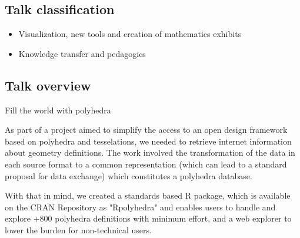 \documentclass[a4paper,10pt]{article}
\begin{document}
\subsection{Talk classification}

\begin{itemize}
\item Visualization, new tools and creation of mathematics exhibits
\item Knowledge transfer and pedagogics 
\end{itemize}

\subsection{Talk overview}



Fill the world with polyhedra

As part of a project aimed to simplify the access to an open design framework based on polyhedra and tesselations, we needed to retrieve internet information about geometry definitions. The work involved the transformation of the data in each source format to a common representation (which can lead to a standard proposal for data exchange) which constitutes a polyhedra database.  

With that in mind, we created a standards based R package, which is available on the CRAN Repository as "Rpolyhedra" and enables users to handle and explore +800 polyhedra definitions with minimum effort, and a web explorer \cite{RPOLY_EXPLORER} to lower the burden for non-technical users.
\end{document}
